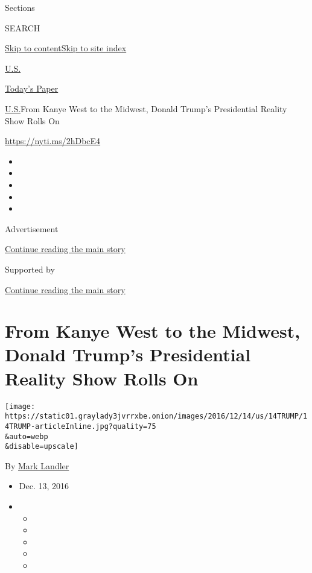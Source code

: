 Sections

SEARCH

\protect\hyperlink{site-content}{Skip to
content}\protect\hyperlink{site-index}{Skip to site index}

\href{https://www.nytimes3xbfgragh.onion/section/us}{U.S.}

\href{https://myaccount.nytimes3xbfgragh.onion/auth/login?response_type=cookie\&client_id=vi}{}

\href{https://www.nytimes3xbfgragh.onion/section/todayspaper}{Today's
Paper}

\href{/section/us}{U.S.}\textbar{}From Kanye West to the Midwest, Donald
Trump's Presidential Reality Show Rolls On

\url{https://nyti.ms/2hDbcE4}

\begin{itemize}
\item
\item
\item
\item
\item
\end{itemize}

Advertisement

\protect\hyperlink{after-top}{Continue reading the main story}

Supported by

\protect\hyperlink{after-sponsor}{Continue reading the main story}

\hypertarget{from-kanye-west-to-the-midwest-donald-trumps-presidential-reality-show-rolls-on}{%
\section{From Kanye West to the Midwest, Donald Trump's Presidential
Reality Show Rolls
On}\label{from-kanye-west-to-the-midwest-donald-trumps-presidential-reality-show-rolls-on}}

\texttt{[image: https://static01.graylady3jvrrxbe.onion/images/2016/12/14/us/14TRUMP/14TRUMP-articleInline.jpg?quality=75\\\&auto=webp\\\&disable=upscale]}

By \href{http://www.nytimes3xbfgragh.onion/by/mark-landler}{Mark
Landler}

\begin{itemize}
\item
  Dec. 13, 2016
\item
  \begin{itemize}
  \item
  \item
  \item
  \item
  \item
  \end{itemize}
\end{itemize}

